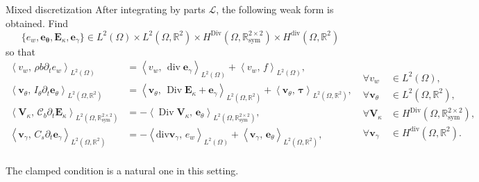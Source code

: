 \documentclass[aspectratio=169]{ISAE-Beamer}
\DeclareMathOperator*{\Div}{Div}
\renewcommand{\div}{\operatorname{div}}
\newcommand{\bbR}{\mathbb{R}}
\newcommand{\inner}[3][]{\ensuremath{\left\langle #2, \, #3 \right\rangle_{#1}}}
\begin{document}
\begin{frame}{Mixed discretization}
After integrating by parts $\mathcal{L}$, the following weak form is obtained. Find
$$\{e_w, \bm{e}_{\bm{\theta}}, \bm{E}_{\kappa}, \bm{e}_{\gamma}\} \in L^2(\Omega) \times L^2(\Omega, \bbR^2) \times H^{\Div}(\Omega, \bbR^{2\times 2}_{\text{sym}}) \times H^{\div}(\Omega, \bbR^2)$$
so that 
\begin{equation*}
\begin{aligned}
\inner[L^2(\Omega)]{v_w}{\rho b \partial_t {e}_w} &= \inner[L^2(\Omega)]{v_w}{\div \bm{e}_\gamma} + \inner[L^2(\Omega)]{v_w}{f}, \\ 
\inner[L^2(\Omega, \bbR^2)]{\bm{v}_\theta}{I_\theta \partial_t {\bm{e}}_\theta} &= \inner[L^2(\Omega, \bbR^2)]{\bm{v}_\theta}{\Div \bm{E}_\kappa + \bm{e}_\gamma} + \inner[L^2(\Omega, \bbR^2)]{\bm{v}_\theta}{\bm{\tau}}, \\  
\inner[L^2(\Omega, \bbR^{2\times 2}_{\text{sym}})]{\bm{V}_\kappa}{\bm{\mathcal{C}}_{b} \partial_t{\bm{E}}_\kappa} &= -\inner[L^2(\Omega, \bbR^{2\times 2}_{\text{sym}})]{\Div \bm{V}_\kappa}{\bm{e}_\theta}, \\ 
\inner[L^2(\Omega, \bbR^2)]{\bm{v}_\gamma}{C_s \partial_t{\bm{e}}_\gamma} &= -\inner[L^2(\Omega)]{\mathrm{div} \bm{v}_\gamma}{e_w} + \inner[L^2(\Omega, \bbR^2)]{\bm{v}_\gamma}{\bm{e}_{\theta}}, \\ 
\end{aligned} \;
\begin{aligned}
\forall v_w &\in L^2(\Omega), \\
\forall \bm{v}_\theta &\in L^2(\Omega, \bbR^2), \\
\forall \bm{V}_\kappa &\in H^{\Div}(\Omega, \bbR^{2\times 2}_{\text{sym}}), \\
\forall \bm{v}_\gamma &\in H^{\div}(\Omega, \bbR^2).
\end{aligned}
\end{equation*}

The clamped condition is a natural one in this setting.
\end{frame}
\end{document}

